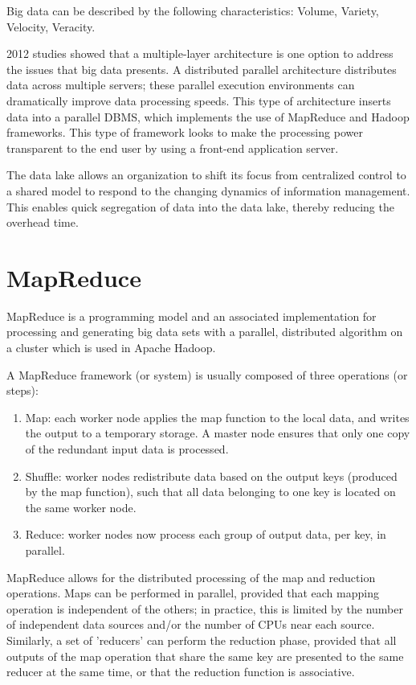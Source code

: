 \documentclass{article}
\begin{document}
Big data can be described by the following characteristics: Volume, Variety, Velocity, Veracity\cite{hilbert2016big}.

2012 studies showed that a multiple-layer architecture is one option to address the issues that big data presents. A distributed parallel architecture distributes data across multiple servers; these parallel execution environments can dramatically improve data processing speeds. This type of architecture inserts data into a parallel DBMS, which implements the use of MapReduce and Hadoop frameworks. This type of framework looks to make the processing power transparent to the end user by using a front-end application server\cite{boja2012distributed}.

The data lake allows an organization to shift its focus from centralized control to a shared model to respond to the changing dynamics of information management. This enables quick segregation of data into the data lake, thereby reducing the overhead time.

\section{MapReduce}

MapReduce is a programming model and an associated implementation for processing and generating big data sets with a parallel, distributed algorithm on a cluster which is used in Apache Hadoop.

A MapReduce framework (or system) is usually composed of three operations (or steps): 
\begin{enumerate}
\item{Map: each worker node applies the map function to the local data, and writes the output to a temporary storage. A master node ensures that only one copy of the redundant input data is processed.}
\item{Shuffle: worker nodes redistribute data based on the output keys (produced by the map function), such that all data belonging to one key is located on the same worker node.}
\item{Reduce: worker nodes now process each group of output data, per key, in parallel.}
\end{enumerate}

MapReduce allows for the distributed processing of the map and reduction operations. Maps can be performed in parallel, provided that each mapping operation is independent of the others; in practice, this is limited by the number of independent data sources and/or the number of CPUs near each source. Similarly, a set of 'reducers' can perform the reduction phase, provided that all outputs of the map operation that share the same key are presented to the same reducer at the same time, or that the reduction function is associative. 
\end{document}
